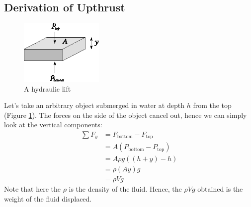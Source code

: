 \documentclass[11pt]{article}
\newcommand{\resumetocwriting}{%
	\addtocontents{toc}{\protect\setcounter{tocdepth}{\arabic{tocdepth}}}}
\numberwithin{equation}{section}
\begin{document}
\begin{appendices}
			\section{Derivation of Upthrust}
			\label{appdx:upthrust}
			\begin{figure}				
				\centering
				\vspace{-0.7cm}
				\includegraphics[width=4cm]{upthrust.eps}
				\caption{A hydraulic lift}
				\label{fig:appdx:upthrust}
				\vspace{-0.5cm}
			\end{figure}
			Let's take an arbitrary object submerged in water at depth $h$ from the top (Figure \ref{fig:appdx:upthrust}). The forces on the side of the object cancel out, hence we can simply look at the vertical components:
			\begin{align*}
				\sum F_y &= F_{\text{bottom}} - F_{\text{top}} \\
				&= A(P_{\text{bottom}} - P_{\text{top}}) \\
				&= A\rho g((h+y) - h) \\
				&= \rho (Ay)g \\
				&= \rho V \! g
			\end{align*}
			Note that here the $\rho$ is the density of the fluid. Hence, the $\rho V\!g$ obtained is the weight of the fluid displaced.
			\resumetocwriting
		\end{appendices}
		
\end{document}
